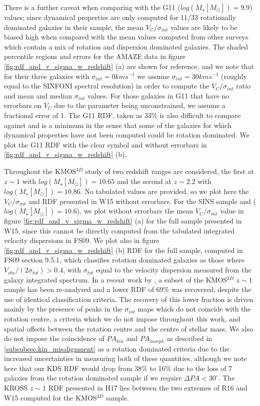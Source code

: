 \documentclass[fleqn,usenatbib]{mn2e}
\begin{document}
There is a further caveat when comparing with the G11 ($log(M_{\star}[M_{\odot}])=9.9$) values; since dynamical properties are only computed for 11/33 rotationally dominated galaxies in their sample, the mean $V_{C}/\sigma_{int}$ values are likely to be biased high when compared with the mean values computed from other surveys which contain a mix of rotation and dispersion dominated galaxies.
The shaded percentile regions and errors for the AMAZE data in figure \ref{fig:rdf_and_v_sigma_w_redshift} (a) are shown for reference, and we note that for their three galaxies with $\sigma_{int} = 0kms^{-1}$ we assume $\sigma_{int} = 30kms^{-1}$ (roughly equal to the SINFONI spectral resolution) in order to compute the $V_{C}/\sigma_{int}$ ratio and mean and median $\sigma_{int}$ values.
For those galaxies in G11 that have no errorbars on $V_{C}$ due to the parameter being unconstrained, we assume a fractional error of 1.
The G11 RDF, taken as 33\% is also difficult to compare against and is a minimum in the sense that some of the galaxies for which dynamical properties have not been computed could be rotation dominated.
We plot the G11 RDF with the clear symbol and without errorbars in \ref{fig:rdf_and_v_sigma_w_redshift} (b). 

Throughout the KMOS$^{3D}$ study of \cite[W15]{Wisnioski2015} two redshift ranges are considered, the first at $z\sim 1$ with $log(M_{\star}[M_{\odot}])=10.65$ and the second at $z\sim 2.2$ with $log(M_{\star}[M_{\odot}])=10.86$.
No tabulated values are provided, so we plot here the $V_{C}/\sigma_{int}$ and RDF presented in W15 without errorbars.
For the SINS sample \citep[FS09]{ForsterSchreiber2009} and \citep[C09]{Cresci2009} ($log(M_{\star}[M_{\odot}])=10.6$), we plot without errorbars the mean $V_{C}/\sigma_{int}$ value in figure \ref{fig:rdf_and_v_sigma_w_redshift} (a) for the full sample presented in W15, since this cannot be directly computed from the tabulated integrated velocity dispersions in FS09.
We plot also in figure \ref{fig:rdf_and_v_sigma_w_redshift} (b) RDF for the full sample, computed in FS09 section 9.5.1, which classifies rotation dominated galaxies as those where $V_{obs}/(2\sigma_{tot}) > 0.4$, with $\sigma_{tot}$ equal to the velocity dispersion measured from the galaxy integrated spectrum.
In a recent work by \cite[R16]{Rodrigues2016}, a subset of the KMOS$^{3D}$ $z \sim 1$ sample has been re-analysed and a lower RDF of 69\% was recovered, despite the use of identical classification criteria.
The recovery of this lower fraction is driven mainly by the presence of peaks in the $\sigma_{int}$ maps which do not coincide with the rotation centre, a criteria which we do not impose throughout this work, and spatial offsets between the rotation centre and the centre of stellar mass.
We also do not impose the coincidence of $PA_{kin}$ and $PA_{morph}$ as described in \cref{subsubsec:kin_misalignment} as a rotation dominated criteria due to the increased uncertainties in measuring both of these quantities, although we note here that our KDS RDF would drop from 38\% to 16\% due to the loss of 7 galaxies from the rotation dominated sample if we require $\Delta PA < 30^{\circ}$. 
The KROSS $z\sim1$ RDF presented in H17 lies between the two extremes of R16 and W15 computed for the KMOS$^{3D}$ sample.
\end{document}
